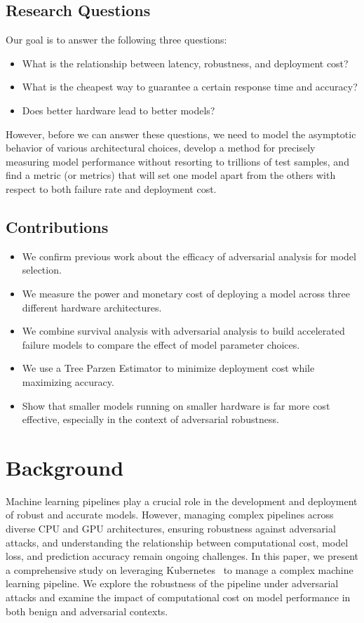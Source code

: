 \documentclass[conference]{IEEEtran}
\begin{document}
\subsection{Research Questions}
Our goal is to answer the following three questions:
\begin{itemize}
    \item What is the relationship between latency, robustness, and deployment cost?
    \item What is the cheapest way to guarantee a certain response time and accuracy?
    \item Does better hardware lead to better models?
\end{itemize}

However, before we can answer these questions, we need to model the asymptotic behavior of various architectural choices, develop a method for precisely measuring model performance without resorting to trillions of test samples, and find a metric (or metrics) that will set one model apart from the others with respect to both failure rate and deployment cost. 

\subsection{Contributions}
\begin{itemize}
    \item We confirm previous work about the efficacy of adversarial analysis for model selection.
    \item We measure the power and monetary cost of deploying a model across three different hardware architectures.
    \item We combine survival analysis with adversarial analysis to build accelerated failure models to compare the effect of model parameter choices.
    \item We use a Tree Parzen Estimator to minimize deployment cost while maximizing accuracy.
    \item Show that smaller models running on smaller hardware is far more cost effective, especially in the context of adversarial robustness.
\end{itemize}


\section{Background}
Machine learning pipelines play a crucial role in the development and deployment of robust and accurate models. However, managing complex pipelines across diverse CPU and GPU architectures, ensuring robustness against adversarial attacks, and understanding the relationship between computational cost, model loss, and prediction accuracy remain ongoing challenges. In this paper, we present a comprehensive study on leveraging Kubernetes~\cite{k8s} to manage a complex machine learning pipeline. We explore the robustness of the pipeline under adversarial attacks and examine the impact of computational cost on model performance in both benign and adversarial contexts.
\end{document}
